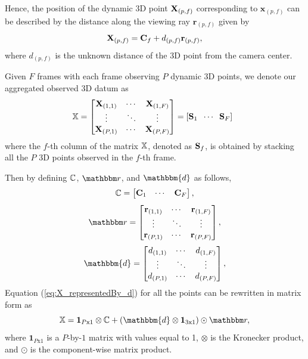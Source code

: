 Hence, the position of the dynamic 3D point $\mathbf X_{(p,f)}$ corresponding to $\mathbf x_{(p,f)}$ can be described by the distance along the viewing ray $\mathbf{r}_{(p,f)}$ given by
\begin{equation}
\mathbf X_{(p,f)} = \mathbf{C}_f + d_{(p,f)} \mathbf{r}_{(p,f)},
\label{eq:X_representedBy_d}
\end{equation}
where $d_{(p,f)}$ is the unknown distance of the 3D point from the camera center.

Given $F$ frames with each frame observing $P$ dynamic 3D points, we denote our aggregated observed 3D datum as
\begin{equation}
\label{eq:observationstructure}
\mathbb X =
\begin{bmatrix}
\mathbf X_{(1,1)} & \cdots & \mathbf X_{(1,F)} \\
            \vdots  & \ddots & \vdots              \\
\mathbf X_{(P,1)} & \cdots & \mathbf X_{(P,F)} \\
\end{bmatrix} =
\left[
\mathbf S_1\; \;  \cdots \; \;   \mathbf S_F
\right]\;\;
\end{equation}
where the $f$-th column of the matrix $\mathbb X$, denoted as $\mathbf S_f$, is obtained by stacking all the $P$ 3D points observed in the $f$-th frame.

Then by defining $\mathbb C$, $\allr$, and $\mathbbm{d}$ as follows,
\begin{equation}
\mathbb C =
\begin{bmatrix}
\mathbf C_{1} & \cdots & \mathbf C_{F}
\end{bmatrix},
\end{equation}
\begin{equation}
\allr = 
\begin{bmatrix}
\oner_{(1,1)} & \cdots & \oner_{(1,F)} \\
            \vdots  & \ddots & \vdots              \\
\oner_{(P,1)} & \cdots & \oner_{(P,F)} \\
\end{bmatrix},
\end{equation}
\begin{equation}
\mathbbm{d} =
\begin{bmatrix}
d_{(1,1)} & \cdots & d_{(1,F)} \\
            \vdots  & \ddots & \vdots              \\
d_{(P,1)} & \cdots & d_{(P,F)} \\
\end{bmatrix},
\end{equation}
Equation (\ref{eq:X_representedBy_d}) for all the points can be rewritten in matrix form as
\begin{equation}
\allX = \mathbf{1}_{P\text{x}1} \otimes \allC + 
(\mathbbm{d} \otimes \mathbf{1}_{3\text{x}1}) \odot \allr,
\label{eq:X_representedBy_d_all}
\end{equation}
where $\mathbf{1}_{P\text{x}1}$ is a $P$-by-$1$ matrix with values equal to 1, $\otimes$ is the Kronecker product, and $\odot$ is the component-wise matrix product. %

